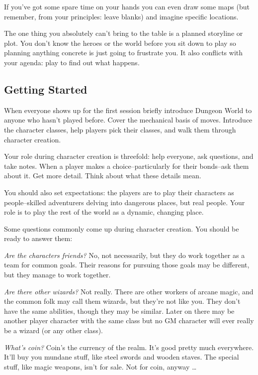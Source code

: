 If you've got some spare time on your hands you can even draw some maps (but remember, from your principles: leave blanks) and imagine specific locations.


The one thing you absolutely can't bring to the table is a planned storyline or plot. You don't know the heroes or the world before you sit down to play so planning anything concrete is just going to frustrate you. It also conflicts with your agenda: play to find out what happens.
\subsection{Getting Started}


When everyone shows up for the first session briefly introduce Dungeon World to anyone who hasn't played before. Cover the mechanical basis of moves. Introduce the character classes, help players pick their classes, and walk them through character creation.


Your role during character creation is threefold: help everyone, ask questions, and take notes. When a player makes a choice--particularly for their bonds--ask them about it. Get more detail. Think about what these details mean.


You should also set expectations: the players are to play their characters as people--skilled adventurers delving into dangerous places, but real people. Your role is to play the rest of the world as a dynamic, changing place.


Some questions commonly come up during character creation. You should be ready to answer them:


\emph{Are the characters friends?}
No, not necessarily, but they do work together as a team for common goals. Their reasons for pursuing those goals may be different, but they manage to work together.


\emph{Are there other wizards?}
Not really. There are other workers of arcane magic, and the common folk may call them wizards, but they're not like you. They don't have the same abilities, though they may be similar. Later on there may be another player character with the same class but no GM character will ever really be a wizard (or any other class).


\emph{What's coin?}
Coin's the currency of the realm. It's good pretty much everywhere. It'll buy you mundane stuff, like steel swords and wooden staves. The special stuff, like magic weapons, isn't for sale. Not for coin, anyway \ldots 


